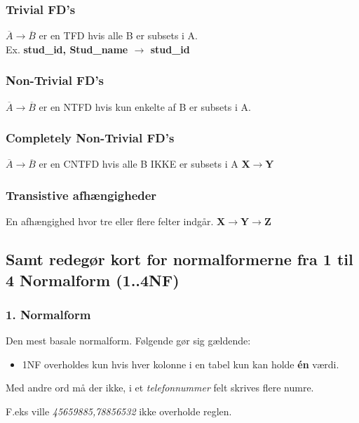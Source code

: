 \subsubsection{Trivial FD's}

$\overline{A} \rightarrow \overline{B}$ er en TFD hvis alle B er subsets i A.\\
Ex. \textbf{stud\_id, Stud\_name $\rightarrow$ stud\_id}

\subsubsection{Non-Trivial FD's}
$\overline{A} \rightarrow \overline{B}$ er en NTFD hvis kun enkelte af B er subsets i A.
\subsubsection{Completely Non-Trivial FD's}
$\overline{A} \rightarrow \overline{B}$ er en CNTFD hvis alle B IKKE er subsets i A
\textbf{X$\rightarrow$Y}
\subsubsection{Transistive afhængigheder}
En afhængighed hvor tre eller flere felter indgår.
\textbf{X$\rightarrow$Y$\rightarrow$Z}


\subsection{Samt redegør kort for normalformerne fra 1 til 4 Normalform (1..4NF)}

\subsubsection{1. Normalform}
Den mest basale normalform. Følgende gør sig gældende:

\begin{itemize}
	\item 1NF overholdes kun hvis hver kolonne i en tabel kun kan holde \textbf{én} værdi. 
\end{itemize}

Med andre ord må der ikke, i et \textit{telefonnummer} felt skrives flere numre. 

F.eks ville \textit{45659885,78856532} ikke overholde reglen.



